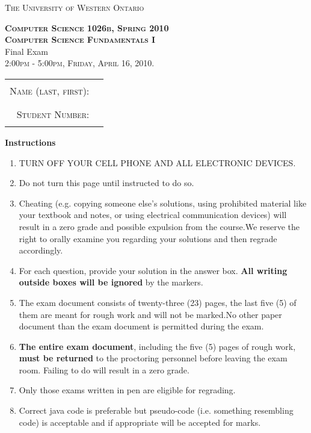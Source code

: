 \documentclass[12pt]{report}
\begin{document}
{\large
\begin{center}
\textsc{The University of Western Ontario}
\end{center}
\begin{center}
\textbf{\textsc{Computer Science 1026b, Spring 2010}}\\
\textbf{\textsc{Computer Science Fundamentals I}}\\
{\large{Final Exam} }\\
\textsc{2:00pm - 5:00pm, Friday, April 16, 2010.}
\end{center}

\begin{center}
\begin{tabular}{ r c}
\textsc{Name (last, first):} & \rule{2.5in}{0.01in} \\
\textsc{Student Number: }& \rule{2.5in}{0.01in}
\end{tabular}
\end{center}

{\normalsize
\vspace{20pt}
\begin{center}\textbf{Instructions}\end{center}
\begin{enumerate}
\item TURN OFF YOUR CELL PHONE AND ALL ELECTRONIC DEVICES.
\item Do not turn this page until instructed to do so.
\item Cheating (e.g. copying someone else's solutions, using prohibited material like your textbook and notes, 
or using electrical communication devices) will result in a zero grade and possible expulsion from the course.We reserve the right to orally examine you regarding your solutions and then regrade accordingly.
\item For each question, provide your solution in the answer box. {\bf All writing outside boxes will be ignored} by the markers. 
\item The exam document consists of twenty-three (23) pages, the last five (5) of them
       are meant for rough work and will not be marked.No other paper document than the exam document
 is permitted during the exam.
\item {\bf The entire exam document}, including the five (5) pages of rough work,
 {\bf must be returned} to 
      the proctoring personnel before leaving the exam room.
     Failing to do will result in a zero grade.
\item Only those exams written in pen are eligible for regrading.
\item Correct java code is preferable but pseudo-code 
(i.e. something resembling code) is 
acceptable and if appropriate will be accepted for marks.
\end{enumerate}
\vspace{10pt}
}

}
\end{document}
